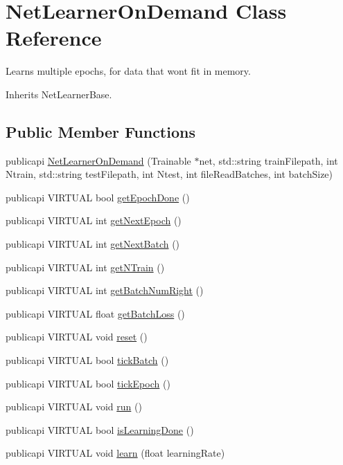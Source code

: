 \hypertarget{classNetLearnerOnDemand}{\section{Net\-Learner\-On\-Demand Class Reference}
\label{classNetLearnerOnDemand}
}


Learns multiple epochs, for data that wont fit in memory.  




Inherits Net\-Learner\-Base.

\subsection*{Public Member Functions}
\begin{DoxyCompactItemize}
\item 
publicapi \hyperlink{classNetLearnerOnDemand_a251a1fde7994aad4d792ab4bfb5e2108}{Net\-Learner\-On\-Demand} (Trainable $\ast$net, std\-::string train\-Filepath, int Ntrain, std\-::string test\-Filepath, int Ntest, int file\-Read\-Batches, int batch\-Size)
\item 
publicapi V\-I\-R\-T\-U\-A\-L bool \hyperlink{classNetLearnerOnDemand_ab90f454677d0fe20ecf143df81271c40}{get\-Epoch\-Done} ()
\item 
publicapi V\-I\-R\-T\-U\-A\-L int \hyperlink{classNetLearnerOnDemand_a0f6804f7ca535f9930d07e9c5a4808f1}{get\-Next\-Epoch} ()
\item 
publicapi V\-I\-R\-T\-U\-A\-L int \hyperlink{classNetLearnerOnDemand_a2b53806f6af0cdbcb67f1606eccc8542}{get\-Next\-Batch} ()
\item 
publicapi V\-I\-R\-T\-U\-A\-L int \hyperlink{classNetLearnerOnDemand_a24c4c1daa5d9e5a57cffe0820be4f180}{get\-N\-Train} ()
\item 
publicapi V\-I\-R\-T\-U\-A\-L int \hyperlink{classNetLearnerOnDemand_aecf6366ca133f63054ffe6088c781a3c}{get\-Batch\-Num\-Right} ()
\item 
publicapi V\-I\-R\-T\-U\-A\-L float \hyperlink{classNetLearnerOnDemand_af50745f9af1104717584237b996ad67b}{get\-Batch\-Loss} ()
\item 
publicapi V\-I\-R\-T\-U\-A\-L void \hyperlink{classNetLearnerOnDemand_a738949f834d0bd01f09f2ff6c1e1b180}{reset} ()
\item 
publicapi V\-I\-R\-T\-U\-A\-L bool \hyperlink{classNetLearnerOnDemand_a4c94046a8851a29edf9e1ca901a541f2}{tick\-Batch} ()
\item 
publicapi V\-I\-R\-T\-U\-A\-L bool \hyperlink{classNetLearnerOnDemand_af4489186b9479b07ca395eea8617ec07}{tick\-Epoch} ()
\item 
publicapi V\-I\-R\-T\-U\-A\-L void \hyperlink{classNetLearnerOnDemand_a2f47f4bf69cd458aa27638da242879c1}{run} ()
\item 
publicapi V\-I\-R\-T\-U\-A\-L bool \hyperlink{classNetLearnerOnDemand_a499c7487bb3a56298ddefdd71e3e58f2}{is\-Learning\-Done} ()
\item 
publicapi V\-I\-R\-T\-U\-A\-L void \hyperlink{classNetLearnerOnDemand_ac4196cd28271f7401a3f9a066975e5ee}{learn} (float learning\-Rate)
\end{DoxyCompactItemize}


